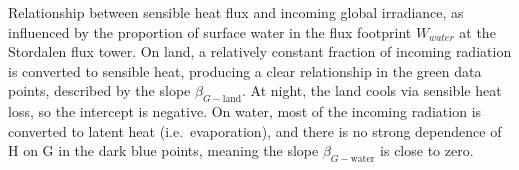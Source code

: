 \label{fig:HvsG_byWwater_Stor} Relationship between sensible
heat flux and incoming global irradiance, as influenced by the
proportion of surface water in the flux footprint \(W_{water}\) at the
Stordalen flux tower. On land, a relatively constant fraction of
incoming radiation is converted to sensible heat, producing a clear
relationship in the green data points, described by the slope
\(\beta_{G-\mathrm{land}}\). At night, the land cools via sensible heat
loss, so the intercept is negative. On water, most of the incoming
radiation is converted to latent heat (i.e.~evaporation), and there is
no strong dependence of H on G in the dark blue points, meaning the
slope \(\beta_{G-\mathrm{water}}\) is close to zero.